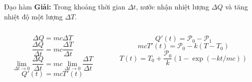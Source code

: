 \begin{frame}{Đạo hàm}
\textbf{Giải:} Trong khoảng thời gian \(\Delta t\), nước nhận nhiệt lượng \(\Delta Q\) và tăng nhiệt độ một lượng \(\Delta T\).
\begin{columns}
    \begin{column}{0.5\textwidth}
\begin{equation}
\Delta Q=mc\Delta T
\end{equation}
\begin{equation}
\dfrac{\Delta Q}{\Delta t}=mc\dfrac{\Delta T}{\Delta t}
\end{equation}
\begin{equation}
\lim_{\Delta t\to 0}\dfrac{\Delta Q}{\Delta t}=mc\lim_{\Delta t\to 0}\dfrac{\Delta T}{\Delta t}
\end{equation}
\begin{equation}
    Q'(t)=mcT'(t)
\end{equation}
    \end{column}
    \begin{column}{0.5\textwidth}
\begin{equation}
Q'(t)=\mathcal{P}_0-\mathcal{P}_1
\end{equation}
\begin{equation}
\boxed{mcT'(t)=\mathcal{P}_0-k(T-T_0)}
\end{equation}
\begin{equation}
    T(t)=T_0+\dfrac{\mathcal P_0}{k}(1-\exp(-kt/mc))
\end{equation}
    \end{column}
\end{columns}
\end{frame}


